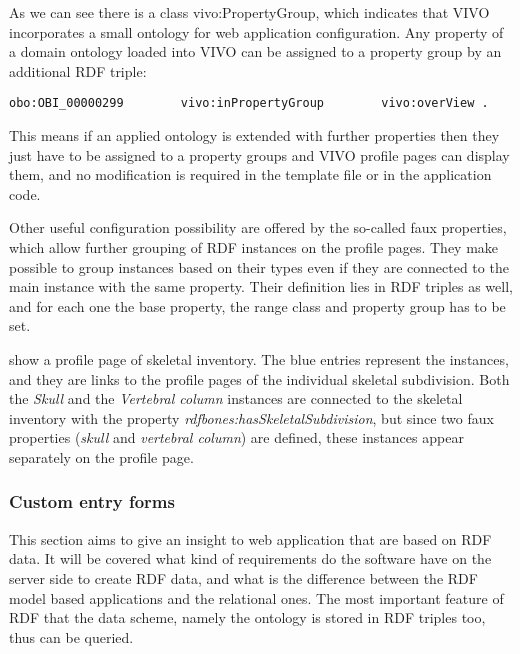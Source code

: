 As we can see there is a class vivo:PropertyGroup, which indicates that VIVO incorporates a small ontology for web application configuration. Any property of a domain ontology loaded into VIVO can be assigned to a property group by an additional RDF triple:

\begin{lstlisting}[captionpos=b, caption=Assigning property to propery group, label=jsListing, belowskip=1em, aboveskip=2em,
basicstyle=\footnotesize,frame=single]
obo:OBI_00000299		vivo:inPropertyGroup 		vivo:overView .
\end{lstlisting}


This means if an applied ontology is extended with further properties then they just have to be assigned to a property groups and VIVO profile pages can display them, and no modification is required in the template file or in the application code.

Other useful configuration possibility are offered by the so-called faux properties, which allow further grouping of RDF instances on the profile pages. They make possible to group instances based on their types even if they are connected to the main instance with the same property. Their definition lies in RDF triples as well, and for each one the base property, the range class and property group has to be set.



 show a profile page of skeletal inventory. The blue entries represent the instances, and they are links to the profile pages of the individual skeletal subdivision. Both the \textit{Skull} and the \textit{Vertebral column} instances are connected to the skeletal inventory with the property \textit{rdfbones:hasSkeletalSubdivision}, but since two faux properties (\textit{skull} and \textit{vertebral column}) are defined, these instances appear separately on the profile page.



\subsubsection{Custom entry forms} \label{vivoCef}


This section aims to give an insight to web application that are based on RDF data. It will be covered what kind of requirements do the software have on the server side to create RDF data, and what is the difference between the RDF model based applications and the relational ones. The most important feature of RDF that the data scheme, namely the ontology is stored in RDF triples too, thus can be queried.

